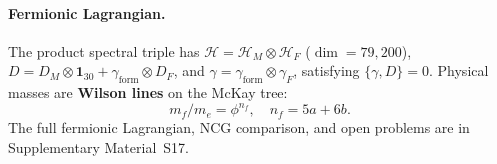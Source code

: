 \documentclass[12pt,a4paper]{article}
\theoremstyle{definition}
\begin{document}
\paragraph{Fermionic Lagrangian.}
The product spectral triple has $\mathcal{H} = \mathcal{H}_M \otimes \mathcal{H}_F$ ($\dim = 79{,}200$),
$D = D_M \otimes \mathbf{1}_{30} + \gamma_{\mathrm{form}} \otimes D_F$, and $\gamma = \gamma_{\mathrm{form}} \otimes \gamma_F$, satisfying $\{\gamma, D\} = 0$.
Physical masses are \textbf{Wilson lines} on the McKay tree:
\begin{equation}
m_f/m_e = \phi^{n_f}, \quad n_f = 5a + 6b.
\label{eq:wilson_line}
\end{equation}
The full fermionic Lagrangian, NCG comparison, and open problems are in Supplementary Material~S17.
\end{document}
